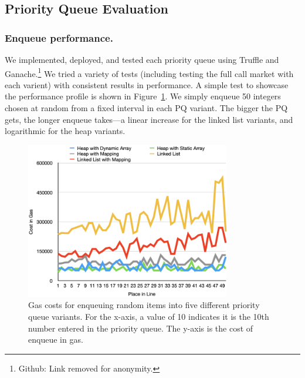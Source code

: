 \subsection{Priority Queue Evaluation} 

\subsubsection{Enqueue performance.} We implemented, deployed, and tested each priority queue using Truffle and Ganache.\footnote{Github: Link removed for anonymity.} We tried a variety of tests (including testing the full call market with each varient) with consistent results in performance. A simple test to showcase the performance profile is shown in Figure~\ref{fig:random_insertion}. We simply enqueue 50 integers chosen at random from a fixed interval in each PQ variant. The bigger the PQ gets, the longer enqueue takes---a linear increase for the linked list variants, and logarithmic for the heap variants. 


\begin{figure}[t]
\centering
\includegraphics[width=0.8\textwidth]{fig/random_insertion.png}
\caption{\footnotesize{Gas costs for enqueuing random items into five different priority queue variants. For the x-axis, a value of 10 indicates it is the 10th number entered in the priority queue. The y-axis is the cost of enqueue in gas.}  \label{fig:random_insertion}}
\end{figure}





